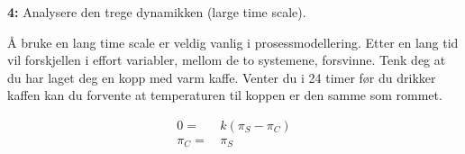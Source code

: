 \begin{center}
    \textbf{4:} Analysere den trege dynamikken (large time scale).
\end{center}

Å bruke en lang time scale er veldig vanlig i prosessmodellering. Etter en lang tid vil forskjellen i effort variabler, mellom de to systemene, forsvinne. Tenk deg at du har laget deg en kopp med varm kaffe. Venter du i 24 timer før du drikker kaffen kan du forvente at temperaturen til koppen er den samme som rommet. 

\begin{align}
    0 =&\, k(\pi_S - \pi_C) \\
    \pi_C =&\, \pi_S
\end{align}